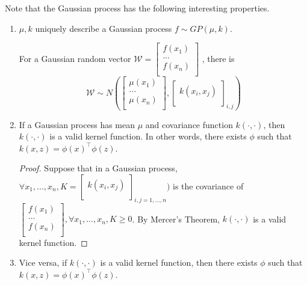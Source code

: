Note that the Gaussian process has the following interesting properties. 
\begin{enumerate}
	\item $\mu, k$ uniquely describe a Gaussian process $f \sim GP(\mu, k)$.
	
	For a Gaussian random vector $\mathcal{W} =
	\begin{bmatrix}
		f(x_1)\\
		...\\
		f(x_n)\\
	\end{bmatrix}$
	, there is 
	\begin{equation*} \label{eu_eqn}
		\mathcal{W} \sim N(
		\begin{bmatrix}
			\mu(x_1)\\
			...\\
			\mu(x_n)\\
		\end{bmatrix}
		,
		\begin{bmatrix}
			k(x_i, x_j)\\
		\end{bmatrix}
		_{i, j})
	\end{equation*}
	
	\item If a Gaussian process has mean $\mu$ and covariance function $k(\cdot, \cdot)$, then $k(\cdot, \cdot)$ is a valid kernel function. In other words, there exists $\phi$ such that $k(x, z) = \phi(x)^\top \phi(z)$. 
	
	\begin{proof}
	Suppose that in a Gaussian process, 
	$\forall x_1, ..., x_n, K = 
	\begin{bmatrix}
		k(x_i, x_j)\\
	\end{bmatrix}_{i, j = 1, ..., n})$ is the covariance of $
	\begin{bmatrix}
		f(x_1)\\
		...\\
		f(x_n)\\
	\end{bmatrix},
	\forall x_1, ..., x_n, K \geq 0$. 
	By Mercer's Theorem, $k(\cdot, \cdot)$ is a valid kernel function. 
	\end{proof}
	
	\item Vice versa, if $k(\cdot, \cdot)$ is a valid kernel function, then there exists $\phi$ such that $k(x, z) = \phi(x)^\top \phi(z)$. 
	

\end{enumerate}
